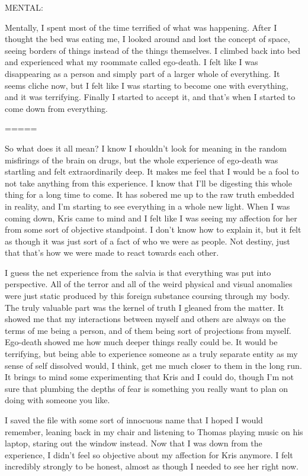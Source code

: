 \begin{sloppypar}
{MENTAL:

Mentally, I spent most of the time terrified of what was happening.  After I thought the bed was eating me, I looked around and lost the concept of space, seeing borders of things instead of the things themselves.  I climbed back into bed and experienced what my roommate called ego-death.  I felt like I was disappearing as a person and simply part of a larger whole of everything.  It seems cliche now, but I felt like I was starting to become one with everything, and it was terrifying.  Finally I started to accept it, and that's when I started to come down from everything.

=====

So what does it all mean?  I know I shouldn't look for meaning in the random misfirings of the brain on drugs, but the whole experience of ego-death was startling and felt extraordinarily deep.  It makes me feel that I would be a fool to not take anything from this experience.  I know that I'll be digesting this whole thing for a long time to come.  It has sobered me up to the raw truth embedded in reality, and I'm starting to see everything in a whole new light.  When I was coming down, Kris came to mind and I felt like I was seeing my affection for her from some sort of objective standpoint.  I don't know how to explain it, but it felt as though it was just sort of a fact of who we were as people.  Not destiny, just that that's how we were made to react towards each other.

I guess the net experience from the salvia is that everything was put into perspective.  All of the terror and all of the weird physical and visual anomalies were just static produced by this foreign substance coursing through my body.  The truly valuable part was the kernel of truth I gleaned from the matter.  It showed me that my interactions between myself and others are always on the terms of me being a person, and of them being sort of projections from myself.  Ego-death showed me how much deeper things really could be.  It would be terrifying, but being able to experience someone as a truly separate entity as my sense of self dissolved would, I think, get me much closer to them in the long run.  It brings to mind some experimenting that Kris and I could do, though I'm not sure that plumbing the depths of fear is something you really want to plan on doing with someone you like.}\end{sloppypar}\vspace{1em}

I saved the file with some sort of innocuous name that I hoped I would remember, leaning back in my chair and listening to Thomas playing music on his laptop, staring out the window instead.  Now that I was down from the experience, I didn't feel so objective about my affection for Kris anymore.  I felt incredibly strongly to be honest, almost as though I needed to see her right now.

